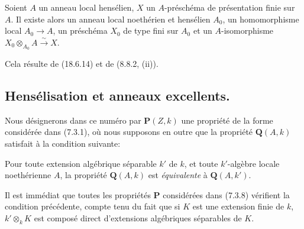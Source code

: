 \begin{corollary}[18.6.15]
\label{IV.18.6.15}
Soient $A$ un anneau local hensélien, $X$ un $A$-préschéma de présentation finie sur $A$. Il existe alors un anneau local noethérien et hensélien $A_0$, un homomorphisme local $A_0\to A$, un préschéma $X_0$ de type fini sur $A_0$ et un $A$-isomorphisme $X_0\otimes_{A_0}A\xrightarrow{\sim}X$.
\end{corollary}

Cela résulte de (18.6.14) et de (8.8.2, (ii)).

\subsection{Hensélisation et anneaux excellents.}

\begin{env}[18.7.1]
\label{IV.18.7.1}
Nous désignerons dans ce numéro par $\mathbf P(Z,k)$ une propriété de la forme considérée dans (7.3.1), où nous supposons en outre que la propriété $\mathbf Q(A,k)$ satisfait à la condition suivante:

Pour toute extension algébrique séparable $k'$ de $k$, et toute $k'$-algèbre locale noethérienne $A$, la propriété $\mathbf Q(A,k)$ est \emph{équivalente} à $\mathbf Q(A,k')$.

Il est immédiat que toutes les propriétés $\mathbf P$ considérées dans (7.3.8) vérifient la condition précédente, compte tenu du fait que si $K$ est une extension finie de $k$, $k'\otimes_k K$ est composé direct d'extensions algébriques séparables de $K$.
\end{env}

